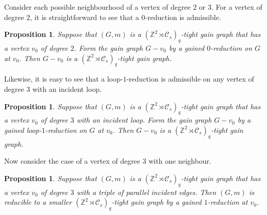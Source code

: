 \documentclass[reqno,a4paper,10pt]{article}
\newtheorem{proposition}[theorem]{Proposition}
\theoremstyle{definition}
\theoremstyle{remark}
\numberwithin{equation}{section}
\numberwithin{figure}{section}
\numberwithin{table}{section}
\newcommand{\Z}{\mathbb{Z}}
\begin{document}
    Consider each possible neighbourhood of a vertex of degree $2$ or $3$. For a vertex of degree $2$, it is straightforward to see that a $0$-reduction is admissible. 
    \begin{proposition}\label{LqZCsDegree2}
		Suppose that $(G,m)$ is a $(\Z^2\rtimes\mathcal{C}_s)_q$-tight gain graph that has a vertex $v_0$ of degree $2$. Form the gain graph $G-v_0$ by a gained $0$-reduction on $G$ at $v_0$. Then $G-v_0$ is a $(\Z^2\rtimes\mathcal{C}_s)_q$-tight gain graph.
	\end{proposition}
    Likewise, it is easy to see that a loop-$1$-reduction is admissible on any vertex of degree $3$ with an incident loop.
    \begin{proposition}\label{LqZCsDegree3Loop}
		Suppose that $(G,m)$ is a $(\Z^2\rtimes\mathcal{C}_s)_q$-tight gain graph that has a vertex $v_0$ of degree $3$ with an incident loop. Form the gain graph $G-v_0$ by a gained loop-$1$-reduction on $G$ at $v_0$. Then $G-v_0$ is a $(\Z^2\rtimes\mathcal{C}_s)_q$-tight gain graph.
	\end{proposition}
    Now consider the case of a vertex of degree $3$ with one neighbour.
    \begin{proposition}\label{LqZCsDegree3Neighbour1}
		Suppose that $(G,m)$ is a $(\Z^2\rtimes\mathcal{C}_s)_q$-tight gain graph that has a vertex $v_0$ of degree $3$ with a triple of parallel incident edges. Then $(G,m)$ is reducible to a smaller $(\Z^2\rtimes\mathcal{C}_s)_q$-tight gain graph by a gained $1$-reduction at $v_0$.
	\end{proposition}
\end{document}
